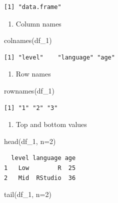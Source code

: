 \documentclass[
  letterpaper,
  DIV=11,
  numbers=noendperiod]{scrreprt}
\newenvironment{Shaded}{\begin{snugshade}}{\end{snugshade}}
\newcommand{\AttributeTok}[1]{\textcolor[rgb]{0.40,0.45,0.13}{#1}}
\newcommand{\DecValTok}[1]{\textcolor[rgb]{0.68,0.00,0.00}{#1}}
\newcommand{\FunctionTok}[1]{\textcolor[rgb]{0.28,0.35,0.67}{#1}}
\newcommand{\NormalTok}[1]{\textcolor[rgb]{0.00,0.23,0.31}{#1}}
\providecommand{\tightlist}{%
  \setlength{\itemsep}{0pt}\setlength{\parskip}{0pt}}\usepackage{longtable,booktabs,array}
\begin{document}
\begin{verbatim}
[1] "data.frame"
\end{verbatim}

\begin{enumerate}
\def\labelenumi{\alph{enumi}.}
\setcounter{enumi}{4}
\tightlist
\item
  Column names
\end{enumerate}

\begin{Shaded}
\begin{Highlighting}[]
\FunctionTok{colnames}\NormalTok{(df\_1)}
\end{Highlighting}
\end{Shaded}

\begin{verbatim}
[1] "level"    "language" "age"     
\end{verbatim}

\begin{enumerate}
\def\labelenumi{\alph{enumi}.}
\setcounter{enumi}{5}
\tightlist
\item
  Row names
\end{enumerate}

\begin{Shaded}
\begin{Highlighting}[]
\FunctionTok{rownames}\NormalTok{(df\_1)}
\end{Highlighting}
\end{Shaded}

\begin{verbatim}
[1] "1" "2" "3"
\end{verbatim}

\begin{enumerate}
\def\labelenumi{\alph{enumi}.}
\setcounter{enumi}{6}
\tightlist
\item
  Top and bottom values
\end{enumerate}

\begin{Shaded}
\begin{Highlighting}[]
\FunctionTok{head}\NormalTok{(df\_1, }\AttributeTok{n=}\DecValTok{2}\NormalTok{)}
\end{Highlighting}
\end{Shaded}

\begin{verbatim}
  level language age
1   Low        R  25
2   Mid  RStudio  36
\end{verbatim}

\begin{Shaded}
\begin{Highlighting}[]
\FunctionTok{tail}\NormalTok{(df\_1, }\AttributeTok{n=}\DecValTok{2}\NormalTok{)}
\end{Highlighting}
\end{Shaded}
\end{document}

